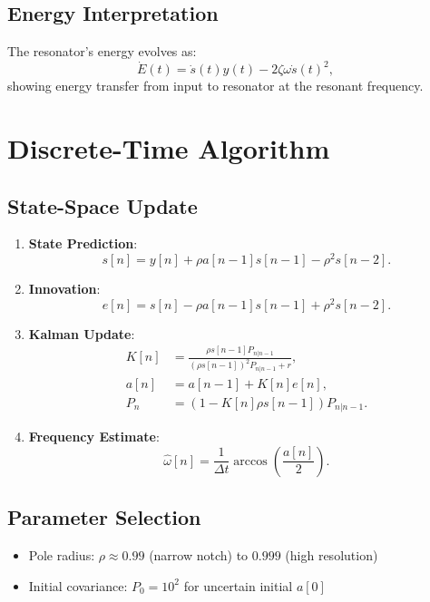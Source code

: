 \documentclass{article}
\begin{document}
\subsection{Energy Interpretation}
The resonator's energy evolves as:
\begin{equation}
\dot{E}(t) = \dot{s}(t)y(t) - 2\zeta\omega \dot{s}(t)^2,
\label{eq:energy}
\end{equation}
showing energy transfer from input to resonator at the resonant frequency.

\section{Discrete-Time Algorithm}
\subsection{State-Space Update}
\begin{enumerate}
\item \textbf{State Prediction}:
\begin{equation}
s[n] = y[n] + \rho a[n-1]s[n-1] - \rho^2 s[n-2].
\label{eq:state_update}
\end{equation}

\item \textbf{Innovation}:
\begin{equation}
e[n] = s[n] - \rho a[n-1]s[n-1] + \rho^2 s[n-2].
\label{eq:innovation}
\end{equation}

\item \textbf{Kalman Update}:
\begin{align}
K[n] &= \frac{\rho s[n-1] P_{n|n-1}}{(\rho s[n-1])^2 P_{n|n-1} + r}, \label{eq:kalman_gain} \\
a[n] &= a[n-1] + K[n]e[n], \label{eq:param_update} \\
P_n &= (1 - K[n]\rho s[n-1]) P_{n|n-1}. \label{eq:cov_update}
\end{align}

\item \textbf{Frequency Estimate}:
\begin{equation}
\hat{\omega}[n] = \frac{1}{\Delta t}\arccos\!\left(\frac{a[n]}{2}\right).
\label{eq:freq_update}
\end{equation}
\end{enumerate}

\subsection{Parameter Selection}
\begin{itemize}
\item Pole radius: $\rho \approx 0.99$ (narrow notch) to $0.999$ (high resolution)
\item Initial covariance: $P_0 = 10^2$ for uncertain initial $a[0]$
\end{itemize}
\end{document}
